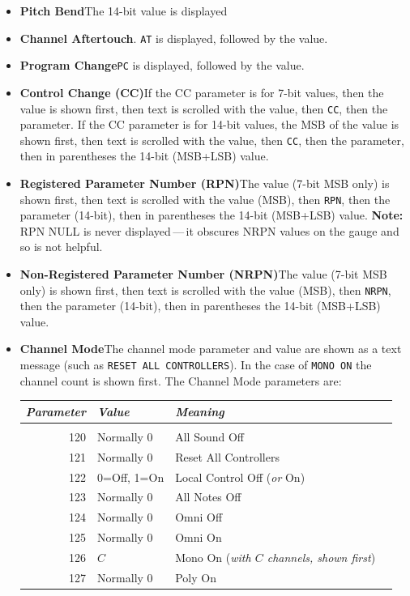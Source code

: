 \documentclass{article}
\begin{document}
\begin{itemize}
\item {\bf Pitch Bend}\quad The 14-bit value is displayed
\item {\bf Channel Aftertouch}.  \texttt{AT} is displayed, followed by the value.
\item {\bf Program Change}\quad \texttt{PC} is displayed, followed by the value.
\item {\bf Control Change (CC)}\quad If the CC parameter is for 7-bit values, then the value is shown first, then text is scrolled with the value, then \texttt{CC}, then the parameter.  If the CC parameter is for 14-bit values, the MSB of the value is shown first, then text is scrolled with the value, then \texttt{CC}, then the parameter, then in parentheses the 14-bit (MSB+LSB) value.
\item {\bf Registered Parameter Number (RPN)}\quad The value (7-bit MSB only) is shown first, then text is scrolled with the value (MSB), then \texttt{RPN}, then the parameter (14-bit), then in parentheses the 14-bit (MSB+LSB) value.   {\bf Note:} RPN NULL is never displayed\,---\,it obscures NRPN values on the gauge and so is not helpful.
\item {\bf Non-Registered Parameter Number (NRPN)}\quad The value (7-bit MSB only) is shown first, then text is scrolled with the value (MSB), then \texttt{NRPN}, then the parameter (14-bit), then in parentheses the 14-bit (MSB+LSB) value.
\item {\bf Channel Mode}\quad The channel mode parameter and value are shown as a text message (such as \texttt{RESET ALL CONTROLLERS}).  In the case of \texttt{MONO ON} the channel count is shown first.  The Channel Mode parameters are:
\begin{center}\begin{tabular}{@{}rlll@{}}
{\it Parameter}&{\it Value}&{\it Meaning}\\[0.1em]
\hline\\[-0.9em]
120&Normally 0&All Sound Off\\
121&Normally 0&Reset All Controllers\\
122&0=Off, 1=On&Local Control Off ({\it or} On)\\
123&Normally 0&All Notes Off\\
124&Normally 0&Omni Off\\
125&Normally 0&Omni On\\
126&\(C\)&Mono On ({\it with \(C\) channels, shown first})\\
127&Normally 0&Poly On\\

\end{tabular}
\end{center}
\end{itemize}
\end{document}
